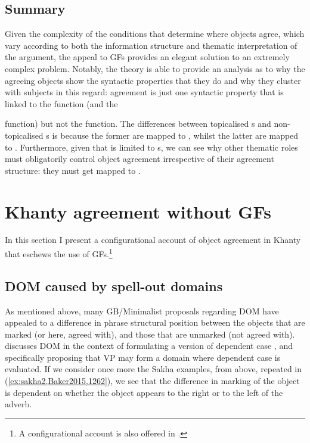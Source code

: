 \documentclass[output=paper
,modfonts
,nonflat]{langsci/langscibook}
\begin{document}
\subsection{Summary}

Given the complexity of the conditions that determine where objects agree, which vary according to both the information structure and thematic interpretation of the argument, the appeal to GFs provides an elegant solution to an extremely complex problem.  
Notably, the theory is able to provide an analysis as to why the agreeing objects show the syntactic properties that they do and why they cluster with subjects in this regard: agreement is just one syntactic property that is linked to the \object {} function (and the \subject {} function) but not the \robj {} function.
The differences between topicalised \theme s and non-topicalised \theme s is because the former are mapped to \object, whilst the latter are mapped to \robj.
Furthermore, given that \robj {} is limited to \theme s, we can see why other thematic roles must obligatorily control object agreement irrespective of their agreement structure: they must get mapped to \object.

\section{Khanty agreement without GFs}\label{reanalysis}

In this section I present a configurational account of object agreement in Khanty that eschews the use of GFs.\footnote{A configurational account is also offered in \citet{barany2016b}.}

\subsection{DOM caused by spell-out domains}

As mentioned above, many GB/Minimalist proposals regarding DOM have appealed to a difference in phrase structural position between the objects that are marked (or here, agreed with), and those that are unmarked (not agreed with).
\citet{Baker2015} discusses DOM in the context of formulating a version of dependent case \citep{Marantz1991}, and specifically proposing that VP may form a domain where dependent case is evaluated. 
If we consider once more the Sakha examples, from above, repeated in (\ref{ex:sakha2,Baker2015,1262}), we see that the difference in marking of the object is dependent on whether the object appears to the right or to the left of the adverb.
\end{document}
